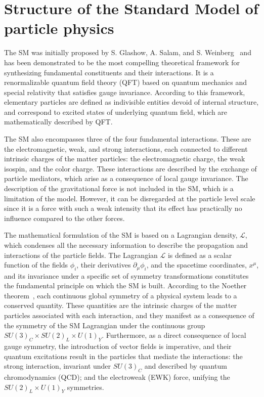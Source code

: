 \section{Structure of the Standard Model of particle physics}
\label{sec:SM}
%
The SM was initially proposed by S. Glashow, A. Salam, and S. Weinberg~\cite{Glashow:1961tr,Salam:1968rm,Weinberg:1967tq} and has been demonstrated to be the most compelling theoretical framework for synthesizing fundamental constituents and their interactions. It is a renormalizable quantum field theory (QFT) based on quantum mechanics and special relativity that satisfies gauge invariance. According to this framework, elementary particles are defined as indivisible entities devoid of internal structure, and correspond to excited states of underlying quantum field, which are mathematically described by QFT.

The SM also encompasses three of the four fundamental interactions. These are the electromagnetic, weak, and strong interactions, each connected to different intrinsic charges of the matter particles: the electromagnetic charge, the weak isospin, and the color charge. These interactions are described by the exchange of particle mediators, which arise as a consequence of local gauge invariance. The description of the gravitational force is not included in the SM, which is a limitation of the model. However, it can be disregarded at the particle level scale since it is a force with such a weak intensity that its effect has practically no influence compared to the other forces.

The mathematical formulation of the SM is based on a Lagrangian density, $\mathcal{L}$, which condenses all the necessary information to describe the propagation and interactions of the particle fields. The Lagrangian $\mathcal{L}$ is defined as a scalar function of the fields $\phi_i$, their derivatives $\partial_\mu \phi_i$, and the spacetime coordinates, $x^\mu$, and its invariance under a specific set of symmetry transformations constitutes the fundamental principle on which the SM is built. According to the Noether theorem~\cite{Noether:1918zz}, each continuous global symmetry of a physical system leads to a conserved quantity. These quantities are the intrinsic charges of the matter particles associated with each interaction, and they manifest as a consequence of the symmetry of the SM Lagrangian under the continuous group $SU(3)_C \times SU(2)_L \times U(1)_Y$. Furthermore, as a direct consequence of local gauge symmetry, the introduction of vector fields is imperative, and their quantum excitations result in the particles that mediate the interactions: the strong interaction, invariant under $SU(3)_C$ and described by quantum chromodynamics (QCD); and the electroweak (EWK) force, unifying the $SU(2)_L \times U(1)_Y$ symmetries.


